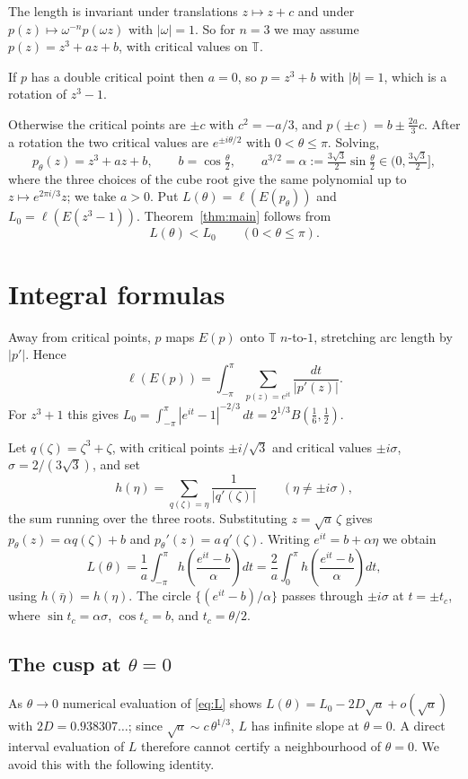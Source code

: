 \documentclass[11pt]{amsart}
\theoremstyle{remark}
\newcommand{\T}{\mathbb{T}}
\begin{document}
The length is invariant under translations $z\mapsto z+c$ and under $p(z)\mapsto \omega^{-n}p(\omega z)$ with $|\omega|=1$. So for $n=3$ we may assume $p(z)=z^3+az+b$, with critical values on $\T$.

If $p$ has a double critical point then $a=0$, so $p=z^3+b$ with $|b|=1$, which is a rotation of $z^3-1$.

Otherwise the critical points are $\pm c$ with $c^2=-a/3$, and $p(\pm c)=b\pm\tfrac{2a}{3}c$. After a rotation the two critical values are $e^{\pm i\theta/2}$ with $0<\theta\le\pi$. Solving,
\[
p_\theta(z)=z^3+az+b,\qquad b=\cos\tfrac\theta2,\qquad a^{3/2}=\alpha:=\tfrac{3\sqrt3}{2}\sin\tfrac\theta2\in\bigl(0,\tfrac{3\sqrt3}{2}\bigr],
\]
where the three choices of the cube root give the same polynomial up to $z\mapsto e^{2\pi i/3}z$; we take $a>0$. Put $L(\theta)=\ell(E(p_\theta))$ and $L_0=\ell(E(z^3-1))$. Theorem~\ref{thm:main} follows from
\begin{equation}\label{eq:star}
L(\theta)<L_0\qquad (0<\theta\le\pi).
\end{equation}

\section{Integral formulas}\label{sec:formula}

Away from critical points, $p$ maps $E(p)$ onto $\T$ $n$-to-$1$, stretching arc length by $|p'|$. Hence
\[
\ell(E(p))=\int_{-\pi}^{\pi}\sum_{p(z)=e^{it}}\frac{dt}{|p'(z)|}.
\]
For $z^3+1$ this gives $L_0=\int_{-\pi}^{\pi}|e^{it}-1|^{-2/3}\,dt=2^{1/3}B(\tfrac16,\tfrac12)$.

Let $q(\zeta)=\zeta^3+\zeta$, with critical points $\pm i/\sqrt3$ and critical values $\pm i\sigma$, $\sigma=2/(3\sqrt3)$, and set
\[
h(\eta)=\sum_{q(\zeta)=\eta}\frac{1}{|q'(\zeta)|}\qquad(\eta\ne\pm i\sigma),
\]
the sum running over the three roots. Substituting $z=\sqrt a\,\zeta$ gives $p_\theta(z)=\alpha q(\zeta)+b$ and $p_\theta'(z)=a\,q'(\zeta)$. Writing $e^{it}=b+\alpha\eta$ we obtain
\begin{equation}\label{eq:L}
L(\theta)=\frac1a\int_{-\pi}^{\pi}h\!\left(\frac{e^{it}-b}{\alpha}\right)dt=\frac2a\int_0^{\pi}h\!\left(\frac{e^{it}-b}{\alpha}\right)dt,
\end{equation}
using $h(\bar\eta)=h(\eta)$. The circle $\{(e^{it}-b)/\alpha\}$ passes through $\pm i\sigma$ at $t=\pm t_c$, where $\sin t_c=\alpha\sigma$, $\cos t_c=b$, and $t_c=\theta/2$.

\subsection*{The cusp at $\theta=0$}
As $\theta\to0$ numerical evaluation of \eqref{eq:L} shows $L(\theta)=L_0-2D\sqrt a+o(\sqrt a)$ with $2D=0.938307\ldots$; since $\sqrt a\sim c\,\theta^{1/3}$, $L$ has infinite slope at $\theta=0$. A direct interval evaluation of $L$ therefore cannot certify a neighbourhood of $\theta=0$. We avoid this with the following identity.
\end{document}
